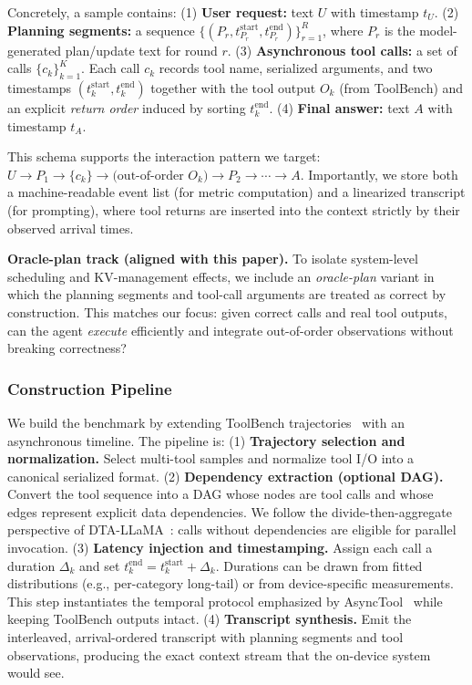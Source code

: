 Concretely, a sample contains:
(1) \textbf{User request:} text $U$ with timestamp $t_U$.
(2) \textbf{Planning segments:} a sequence $\{(P_r, t^{\text{start}}_{P_r}, t^{\text{end}}_{P_r})\}_{r=1}^{R}$, where $P_r$ is the model-generated plan/update text for round $r$.
(3) \textbf{Asynchronous tool calls:} a set of calls $\{c_k\}_{k=1}^{K}$.
Each call $c_k$ records tool name, serialized arguments, and two timestamps $(t^{\text{start}}_k, t^{\text{end}}_k)$ together with the tool output $O_k$ (from ToolBench) and an explicit \emph{return order} induced by sorting $t^{\text{end}}_k$.
(4) \textbf{Final answer:} text $A$ with timestamp $t_A$.

This schema supports the interaction pattern we target: $U \rightarrow P_1 \rightarrow \{c_k\} \rightarrow \text{(out-of-order } O_k\text{)} \rightarrow P_2 \rightarrow \cdots \rightarrow A$.
Importantly, we store both a machine-readable event list (for metric computation) and a linearized transcript (for prompting), where tool returns are inserted into the context strictly by their observed arrival times.

\textbf{Oracle-plan track (aligned with this paper).}
To isolate system-level scheduling and KV-management effects, we include an \emph{oracle-plan} variant in which the planning segments and tool-call arguments are treated as correct by construction.
This matches our focus: given correct calls and real tool outputs, can the agent \emph{execute} efficiently and integrate out-of-order observations without breaking correctness?

\subsubsection{Construction Pipeline}
We build the benchmark by extending ToolBench trajectories~\cite{qin2023toolllm} with an asynchronous timeline.
The pipeline is:
(1) \textbf{Trajectory selection and normalization.} Select multi-tool samples and normalize tool I/O into a canonical serialized format.
(2) \textbf{Dependency extraction (optional DAG).} Convert the tool sequence into a DAG whose nodes are tool calls and whose edges represent explicit data dependencies.
We follow the divide-then-aggregate perspective of DTA-LLaMA~\cite{zhu2025divideThenAggregate}: calls without dependencies are eligible for parallel invocation.
(3) \textbf{Latency injection and timestamping.} Assign each call a duration $\Delta_k$ and set $t^{\text{end}}_k = t^{\text{start}}_k + \Delta_k$.
Durations can be drawn from fitted distributions (e.g., per-category long-tail) or from device-specific measurements.
This step instantiates the temporal protocol emphasized by AsyncTool~\cite{shi2026asynctool} while keeping ToolBench outputs intact.
(4) \textbf{Transcript synthesis.} Emit the interleaved, arrival-ordered transcript with planning segments and tool observations, producing the exact context stream that the on-device system would see.


